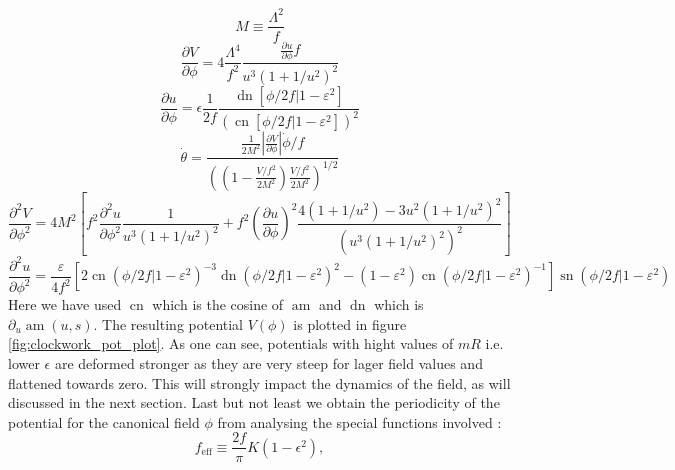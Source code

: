 \documentclass[master,       %
               twoside,        %
               BCOR10mm,       %
               english,ngerman, %
               ]{GAUBM}
\begin{document}
\begin{otherlanguage}{english}
\begin{equation}
\end{equation}
\begin{equation}
	M \equiv \frac{\Lambda^2}{f}
\end{equation}
\begin{equation}
	\frac{\partial V}{\partial \phi} = 4 \frac{\Lambda^4}{f^2} \frac{\frac{\partial u}{\partial \phi} f}{u^3(1 + 1/u^2)^2}
\end{equation}
\begin{equation}
	\frac{\partial u}{\partial \phi} = \epsilon \frac{1}{2 f} \frac{\operatorname{dn}[\phi/2f|1 - \varepsilon^2]}{(\operatorname{cn}[\phi/2f|1 - \varepsilon^2])^2}
\end{equation}
\begin{equation}
	\dot{\theta} = \frac{\frac{1}{2M^2} \left| \frac{\partial V}{\partial \phi} \right| \dot{\phi} / f}{\left(\left(1 - \frac{V/f^2}{2M^2}\right) \frac{V / f^2}{2 M^2} \right)^{1/2}}
\end{equation}
\begin{equation}
	\frac{\partial^2 V}{\partial \phi^2} = 4 M^2 \left[ f^2 \frac{\partial^2 u}{\partial \phi^2} \frac{1}{u^3(1 + 1/u^2)^2} + f^2 \left( \frac{\partial u}{\partial \phi} \right)^2 \frac{4(1 + 1/u^2) - 3u^2(1 + 1/u^2)^2}{\left( u^3(1 + 1/u^2)^2 \right)^2} \right]
\end{equation}
\begin{equation}
	\frac{\partial^2 u}{\partial \phi^2} = \frac{\varepsilon}{4 f^2} \left[ 2 \operatorname{cn}(\phi/2f|1 - \varepsilon^2)^{-3} \operatorname{dn}(\phi/2f|1 - \varepsilon^2)^2 - (1 - \varepsilon^2) \operatorname{cn}(\phi/2f|1 - \varepsilon^2)^{-1} \right] \operatorname{sn}(\phi/2f|1 - \varepsilon^2)
\end{equation}
Here we have used $\operatorname{cn}$ which is the cosine of $\operatorname{am}$ and $\operatorname{dn}$ which is $\partial_u \operatorname{am}(u, s)$.
The resulting potential $V(\phi)$ is plotted in figure \ref{fig:clockwork_pot_plot}. As one can see, potentials with hight values of $mR$ i.e. lower $\epsilon$ are deformed stronger as they are very steep for lager field values and flattened towards zero.
This will strongly impact the dynamics of the field, as will discussed in the next section.
Last but not least we obtain the periodicity of the potential for the canonical field $\phi$ from analysing the special functions involved \cite[eq. 3.69, 3.70]{general_cont_clockwork_Choi_2018}:
\begin{equation}
    f_\mathrm{eff} \equiv \frac{2 f}{\pi} K(1 - \epsilon^2),
\end{equation}

\end{otherlanguage}
\end{document}
